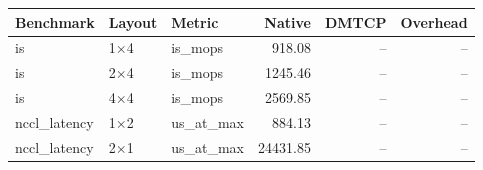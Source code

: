\begin{tabular}{lllrrr}
\toprule
Benchmark & Layout & Metric & Native & DMTCP & Overhead \\
\midrule
is & 1$\times$4 & is\_mops & 918.08 & -- & -- \\
is & 2$\times$4 & is\_mops & 1245.46 & -- & -- \\
is & 4$\times$4 & is\_mops & 2569.85 & -- & -- \\
nccl\_latency & 1$\times$2 & us\_at\_max & 884.13 & -- & -- \\
nccl\_latency & 2$\times$1 & us\_at\_max & 24431.85 & -- & -- \\
\bottomrule
\end{tabular}
